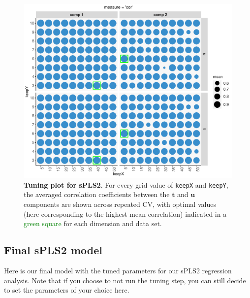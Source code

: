 \documentclass[
]{book}
\newenvironment{Shaded}{\begin{snugshade}}{\end{snugshade}}
\newcommand{\AttributeTok}[1]{\textcolor[rgb]{0.77,0.63,0.00}{#1}}
\newcommand{\CommentTok}[1]{\textcolor[rgb]{0.56,0.35,0.01}{\textit{#1}}}
\newcommand{\FunctionTok}[1]{\textcolor[rgb]{0.00,0.00,0.00}{#1}}
\newcommand{\NormalTok}[1]{#1}
\newcommand{\OtherTok}[1]{\textcolor[rgb]{0.56,0.35,0.01}{#1}}
\newcommand{\SpecialCharTok}[1]{\textcolor[rgb]{0.00,0.00,0.00}{#1}}
\newcommand{\StringTok}[1]{\textcolor[rgb]{0.31,0.60,0.02}{#1}}
\begin{document}
\begin{figure}

{\centering \includegraphics[width=0.6\linewidth]{Figures/PLS/04-spls2-tuning-1} 

}

\caption{\textbf{Tuning plot for sPLS2}. For every grid value of \texttt{keepX} and \texttt{keepY}, the averaged correlation coefficients between the \(\boldsymbol t\) and \(\boldsymbol u\) components are shown across repeated CV, with optimal values (here corresponding to the highest mean correlation) indicated in a \textcolor{green}{green square} for each dimension and data set.}\label{fig:04-spls2-tuning}
\end{figure}



\hypertarget{04:spls2-final}{%
\subsection{Final sPLS2 model}\label{04:spls2-final}}

Here is our final model with the tuned parameters for our sPLS2 regression analysis. Note that if you choose to not run the tuning step, you can still decide to set the parameters of your choice here.

\begin{Shaded}
\end{Shaded}
\end{document}
